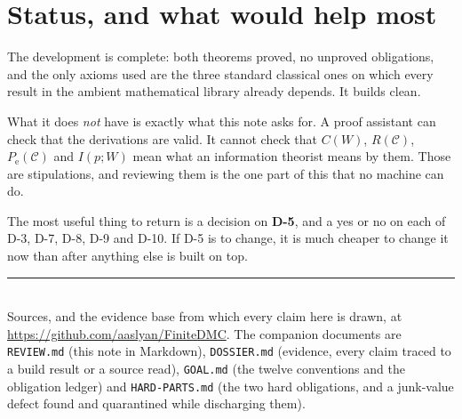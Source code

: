 \documentclass[11pt,a4paper]{article}
\newcommand{\Pe}{P_{\mathrm{e}}}
\newcommand{\code}{\mathcal{C}}
\begin{document}
\section{Status, and what would help most}

The development is complete: both theorems proved, no unproved obligations, and
the only axioms used are the three standard classical ones on which every result
in the ambient mathematical library already depends. It builds clean.

What it does \emph{not} have is exactly what this note asks for. A proof
assistant can check that the derivations are valid. It cannot check that $C(W)$,
$R(\code)$, $\Pe(\code)$ and $I(p;W)$ mean what an information theorist means by
them. Those are stipulations, and reviewing them is the one part of this that no
machine can do.

The most useful thing to return is a decision on \textbf{D-5}, and a yes or no on
each of D-3, D-7, D-8, D-9 and D-10. If D-5 is to change, it is much cheaper to
change it now than after anything else is built on top.

\vfill
\noindent\rule{\textwidth}{0.4pt}\\[2pt]
{\footnotesize
Sources, and the evidence base from which every claim here is drawn, at
\url{https://github.com/aaslyan/FiniteDMC}. The companion documents are
\texttt{REVIEW.md} (this note in Markdown), \texttt{DOSSIER.md} (evidence, every
claim traced to a build result or a source read), \texttt{GOAL.md} (the twelve
conventions and the obligation ledger) and \texttt{HARD-PARTS.md} (the two hard
obligations, and a junk-value defect found and quarantined while discharging
them).}
\end{document}
